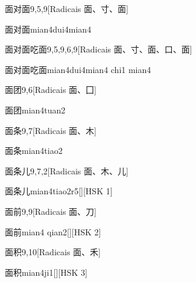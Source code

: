 \begin{entry}{面对面}{9,5,9}[Radicais ⾯、⼨、⾯]
  \begin{phonetics}{面对面}{mian4dui4mian4}
  \end{phonetics}
\end{entry}

\begin{entry}{面对面吃面}{9,5,9,6,9}[Radicais ⾯、⼨、⾯、⼝、⾯]
  \begin{phonetics}{面对面吃面}{mian4dui4mian4 chi1 mian4}
  \end{phonetics}
\end{entry}

\begin{entry}{面团}{9,6}[Radicais ⾯、⼞]
  \begin{phonetics}{面团}{mian4tuan2}
  \end{phonetics}
\end{entry}

\begin{entry}{面条}{9,7}[Radicais ⾯、⽊]
  \begin{phonetics}{面条}{mian4tiao2}
  \end{phonetics}
\end{entry}

\begin{entry}{面条儿}{9,7,2}[Radicais ⾯、⽊、⼉]
  \begin{phonetics}{面条儿}{mian4tiao2r5}[][HSK 1]
  \end{phonetics}
\end{entry}

\begin{entry}{面前}{9,9}[Radicais ⾯、⼑]
  \begin{phonetics}{面前}{mian4 qian2}[][HSK 2]
  \end{phonetics}
\end{entry}

\begin{entry}{面积}{9,10}[Radicais ⾯、⽲]
  \begin{phonetics}{面积}{mian4ji1}[][HSK 3]
  \end{phonetics}
\end{entry}

